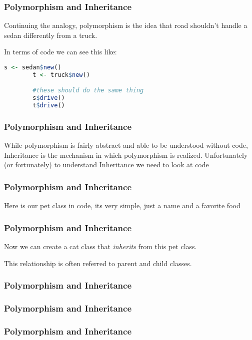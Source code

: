 \documentclass{beamer}
\begin{document}
\begin{frame}[fragile]
    \frametitle{Polymorphism and Inheritance}
    Continuing the analogy, polymorphism is the idea that road shouldn't handle a sedan differently from a truck. \newline

    In terms of code we can see this like:
    \begin{lstlisting}[language=R]
        s <- sedan$new()
        t <- truck$new()

        #these should do the same thing
        s$drive()
        t$drive()
    \end{lstlisting}

\end{frame}
\begin{frame}
    \frametitle{Polymorphism and Inheritance}
    While polymorphism is fairly abstract and able to be understood without code, Inheritance is the mechanism in which polymorphism is realized. \newline
    Unfortunately (or fortunately) to understand Inheritance we need to look at code

\end{frame}


\begin{frame}[fragile]
    \frametitle{Polymorphism and Inheritance}
    Here is our pet class in code, its very simple, just a name and a favorite food
 
\end{frame}
\begin{frame}[fragile]
    \frametitle{Polymorphism and Inheritance}
    Now we can create a cat class that \textit{inherits} from this pet class.

    This relationship is often referred to parent and child classes.

 
\end{frame}

\begin{frame}[fragile]
    \frametitle{Polymorphism and Inheritance}

 
\end{frame}

\begin{frame}[fragile]
    \frametitle{Polymorphism and Inheritance}

 
\end{frame}
\begin{frame}[fragile]
    \frametitle{Polymorphism and Inheritance}

 
\end{frame}
\end{document}

